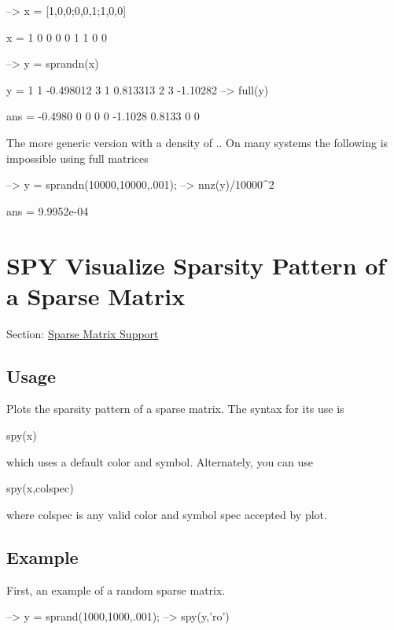 \begin{DoxyVerbInclude}
--> x = [1,0,0;0,0,1;1,0,0]

x = 
 1 0 0 
 0 0 1 
 1 0 0 

--> y = sprandn(x)

y = 
 1 1 -0.498012
 3 1 0.813313
 2 3 -1.10282
--> full(y)

ans = 
   -0.4980         0         0 
         0         0   -1.1028 
    0.8133         0         0 
\end{DoxyVerbInclude}


The more generic version with a density of {.}. On many systems the following is impossible using full matrices


\begin{DoxyVerbInclude}
--> y = sprandn(10000,10000,.001);
--> nnz(y)/10000^2

ans = 
 9.9952e-04 
\end{DoxyVerbInclude}
 \hypertarget{sparse_spy}{}\section{S\-P\-Y Visualize Sparsity Pattern of a Sparse Matrix}\label{sparse_spy}
Section\-: \hyperlink{sec_sparse}{Sparse Matrix Support} \hypertarget{vtkwidgets_vtkxyplotwidget_Usage}{}\subsection{Usage}\label{vtkwidgets_vtkxyplotwidget_Usage}
Plots the sparsity pattern of a sparse matrix. The syntax for its use is \begin{DoxyVerb}   spy(x)
\end{DoxyVerb}
 which uses a default color and symbol. Alternately, you can use \begin{DoxyVerb}   spy(x,colspec)
\end{DoxyVerb}
 where {\ttfamily colspec} is any valid color and symbol spec accepted by {\ttfamily plot}. \hypertarget{variables_struct_Example}{}\subsection{Example}\label{variables_struct_Example}
First, an example of a random sparse matrix.


\begin{DoxyVerbInclude}
--> y = sprand(1000,1000,.001);
--> spy(y,'ro')
\end{DoxyVerbInclude}


